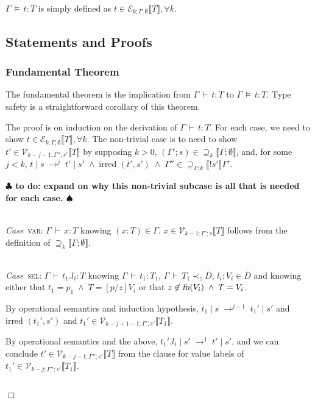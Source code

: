\documentclass[9pt]{sigplanconf}
\newenvironment{myproof}{{\em Proof:}}{$\Box$}
\newcommand{\Case}{{\em Case\ }}
\newcommand{\ts}{\,\vdash\,}
\newcommand{\fn}{\mbox{\sl fn}}
\newcommand{\expand}{\prec}
\newcommand{\remark}[1]{{\bf $\clubsuit$ #1 $\spadesuit$}}
\newcommand{\todo}[1]{\remark{to do: #1}}
\newcommand{\seq}[1]{\overline{#1}}
\newcommand{\subst}[3]{[#1/#2]#3}
\newcommand{\ldecl}[2]{#1 : #2}
\newcommand{\relv}[4]{\mathcal{V}_{#1;#2;#3}\llbracket#4\rrbracket}
\newcommand{\rele}[4]{\mathcal{E}_{#1;#2;#3}\llbracket#4\rrbracket}
\newcommand{\rels}[3]{\mathcal{\supseteq}_{#1}\llbracket#2;#3\rrbracket}
\newcommand{\relg}[3]{\mathcal{\supseteq}_{#1;#2}\llbracket!#3\rrbracket}
\newcommand{\irred}[2]{\text{irred }(#1,#2)}
\newcommand{\andl}{\;\wedge\;}
\newcommand{\reductionl}[5]{#1 \operatorname{|} #2 \;\rightarrow^{#5}\; #3 \operatorname{|} #4}
\newcommand{\ds}{\,\vDash\,}
\begin{document}
$\Gamma \ds t : T$ is simply defined as $t \in \rele k \Gamma \emptyset T,
\forall k$.

\subsection{Statements and Proofs}

\subsubsection{Fundamental Theorem}

The fundamental theorem is the implication from $\Gamma \ts t : T$ to
$\Gamma \ds t : T$. Type safety is a straightforward corollary of this
theorem.

\begin{myproof}
The proof is on induction on the derivation of $\Gamma \ts t : T$. For
each case, we need to show $t \in \rele k \Gamma \emptyset T, \forall k$. The
non-trivial case is to need to show ${t'} \in \relv {k-j-1} {\Gamma''}
{s'} T$ by supposing $k > 0$, $(\Gamma'; s) \in \rels k \Gamma \emptyset$, and, for some
$j < k$, $\reductionl {t} s {t'} {s'} j \andl \irred {t'}
{s'} \andl {\Gamma''} \in \relg \Gamma k {s'} {\Gamma'}$.

\todo{expand on why this non-trivial subcase is all that is needed for each case.}

\ \\

\Case \textsc{var}: $\Gamma \ts x : T$ knowing $(x : T) \in
\Gamma$. $x \in \relv {k-1} {\Gamma'} s T$ follows from the definition of
$\rels k \Gamma \emptyset$.

\ \\

\Case \textsc{sel}: $\Gamma \ts t_1.l_i : T$ knowing $\Gamma \ts t_1 :
T_1$, $\Gamma \ts T_1 \expand_z \seq{D}$, $\ldecl {l_i} {V_i} \in
\seq{D}$ and knowing either that $t_1 = p_1 \andl T = \subst p z
    {V_i}$ or that $z \not\in \fn(V_i) \andl T = V_i$.

By operational semantics and induction hypothesis, $\reductionl {t_1}
s {t_1'} {s'} {j-1}$ and $\irred {t_1'} {s'}$ and ${t_1'} \in \relv
{k-j+1-1} {\Gamma'} {s'} {T_1}$.

By operational semantics and the above, $\reductionl {t_1'.l_i} {s'}
{t'} {s'} 1$, and we can conclude $t' \in \relv {k-j-1} {\Gamma''} {s'}
T$ from the clause for value labels of ${t_1'} \in \relv {k-j}
{\Gamma''} {s'} {T_1}$.

\ \\


\end{myproof}
\end{document}
